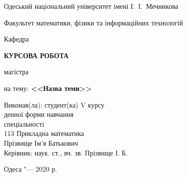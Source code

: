 \thispagestyle{empty}

\begin{center}
Одеський національний університет імені І.~І.~Мечникова

Факультет математики, фізики та інформаційних технологій

Кафедра %
\end{center}

\vfill

\begin{center}
\large
\textbf{КУРСОВА РОБОТА}

магістра

\bigskip

на тему: \textbf{<<Назва теми>>}
\end{center}

\vspace{2cm}

\hfill
\begin{minipage}{0.6\textwidth}
Виконав(ла): студент(ка) V курсу\\
денної форми навчання\\
спеціальності\\
113 Прикладна математика\\
Прізвище Ім'я Батькович\\[3\jot]
Керівник: наук. ст., вч. зв. Прізвище І. Б.
\end{minipage}

\vfill

\begin{center}
Одеса "--- 2020 р.
\end{center}